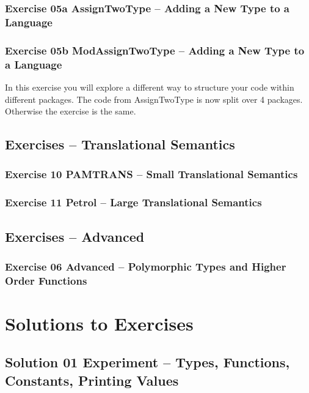 \documentclass[10.5pt,a4]{article}
\begin{document}
\subsubsection{Exercise 05a AssignTwoType – Adding a New Type to a Language}



\subsubsection{Exercise 05b ModAssignTwoType – Adding a New Type to a Language}
In this exercise you will explore a different way to structure your code
within different packages. The code from AssignTwoType is now split over 4 packages.
Otherwise the exercise is the same.

\subsection{Exercises – Translational Semantics}
\subsubsection{Exercise 10 PAMTRANS – Small Translational Semantics}
\lstset{language=}

\lstset{language=modelica}

\subsubsection{Exercise 11 Petrol – Large Translational Semantics}
\lstset{language=}

\lstset{language=modelica}

\subsection{Exercises – Advanced}
\subsubsection{Exercise 06 Advanced – Polymorphic Types and Higher Order Functions}
\lstset{language=}

\lstset{language=modelica}

\section{Solutions to Exercises}

\subsection{Solution 01 Experiment – Types, Functions, Constants, Printing Values}

\end{document}
